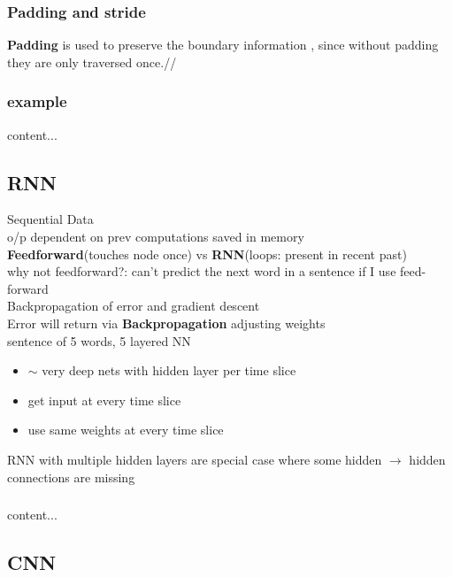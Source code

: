 \documentclass{beamer}
\begin{document}
\begin{frame}\frametitle{Padding and stride}
	\textbf{Padding }is used to preserve the boundary information , since without padding they are only traversed once.//

\end{frame}

\begin{frame}\frametitle{example}
content...
\end{frame}









\subsection{RNN}


\begin{frame}
	Sequential Data\\
	o/p dependent on prev computations saved in memory\\
	\textbf{Feedforward}(touches node once) vs \textbf{RNN}(loops: present in recent past)\\
	why not feedforward?: can't predict the next word in a sentence if I use feed-forward\\
	Backpropagation of error and gradient descent\\
	Error will return via \textbf{Backpropagation} adjusting weights\\
	sentence of 5 words, 5 layered NN\\
	\begin{itemize}
		\item $\sim$ very deep nets with hidden layer per time slice
		\item get input at every time slice
		\item use same weights at every time slice
	\end{itemize}

RNN with multiple hidden layers are special case where some hidden $\rightarrow$ hidden connections are missing

\end{frame}

\begin{frame}\frametitle{}
	content...
\end{frame}


\subsection{CNN}
\end{document}
